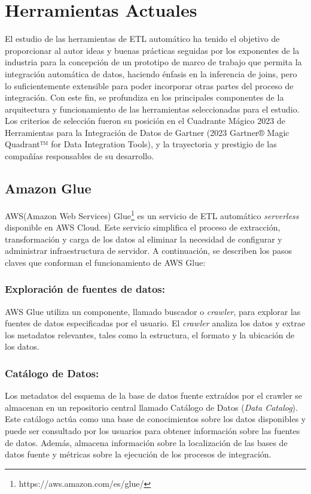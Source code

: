 \section{Herramientas Actuales} \label{section:actual_tools}

El estudio de las herramientas de ETL automático ha tenido el objetivo de proporcionar al autor ideas y buenas 
prácticas seguidas por los exponentes de la industria para la concepción de un prototipo de marco de 
trabajo que permita la integración automática de datos, haciendo énfasis en la inferencia de joins, pero lo 
suficientemente extensible para poder incorporar otras partes del proceso de integración. Con este fin, se 
profundiza en los principales componentes de la arquitectura y funcionamiento de las herramientas seleccionadas 
para el estudio. Los criterios de selección fueron su posición en el Cuadrante Mágico 2023 de Herramientas para 
la Integración de Datos de Gartner (2023 Gartner® Magic Quadrant™ for Data Integration Tools)\cite{magic_q}, y la 
trayectoria y prestigio de las compañías responsables de su desarrollo.

\subsection{Amazon Glue}

AWS(Amazon Web Services) Glue\footnote{https://aws.amazon.com/es/glue/} es un servicio de ETL automático \emph{serverless} 
disponible en AWS Cloud. Este servicio simplifica el proceso de 
extracción, transformación y carga de los datos al eliminar la necesidad de configurar y administrar infraestructura de 
servidor. A continuación, se describen los pasos claves que conforman el funcionamiento de AWS Glue\cite{noauthor_aws_nodate}:

\subsubsection{Exploración de fuentes de datos:}
AWS Glue utiliza un componente, llamado buscador o \emph{crawler}, para explorar las fuentes de datos 
especificadas por el usuario. El \emph{crawler} analiza los datos y extrae los metadatos relevantes, tales como la estructura, el 
formato y la ubicación de los datos.

\subsubsection{Catálogo de Datos:}
Los metadatos del esquema de la base de datos fuente extraídos por el crawler se almacenan en un repositorio central llamado Catálogo de 
Datos (\emph{Data Catalog}). Este catálogo actúa como una base de conocimientos sobre los datos disponibles y puede ser 
consultado por los usuarios para obtener información sobre las fuentes de datos. Además, almacena información 
sobre la localizaci\'on de las bases de datos fuente y m\'etricas sobre la ejecución de los procesos 
de integración\cite{noauthor_aws_nodate}.

